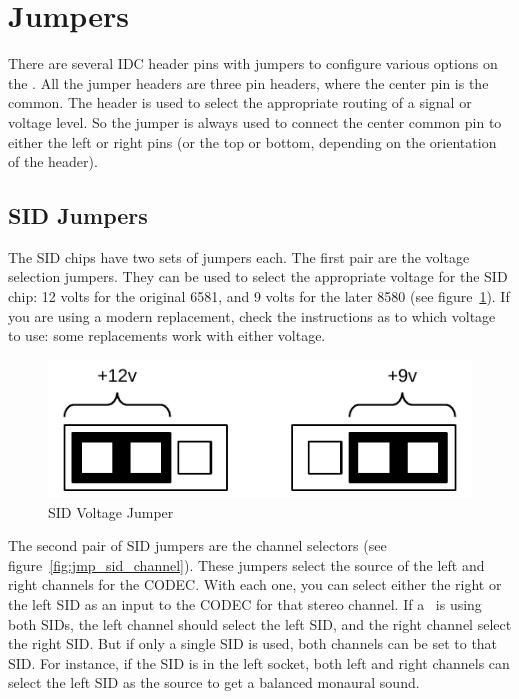 \section*{Jumpers}

There are several IDC header pins with jumpers to configure various options on the \fjr. All the jumper headers are three pin headers, where the center pin is the common. The header is used to select the appropriate routing of a signal or voltage level. So the jumper is always used to connect the center common pin to either the left or right pins (or the top or bottom, depending on the orientation of the header).

\subsection*{SID Jumpers}

The SID chips have two sets of jumpers each. The first pair are the voltage selection jumpers. They can be used to select the appropriate voltage for the SID chip: 12 volts for the original 6581, and 9 volts for the later 8580 (see figure~\ref{fig:jmp_sid_voltage}). If you are using a modern replacement, check the instructions as to which voltage to use: some replacements work with either voltage.

\begin{figure}[ht]
    \begin{center}
        \includegraphics[scale=0.65]{images/jumper_voltage.pdf}
    \end{center}
    \caption{SID Voltage Jumper}
    \label{fig:jmp_sid_voltage}
\end{figure}

The second pair of SID jumpers are the channel selectors (see figure~\ref{fig:jmp_sid_channel}). These jumpers select the source of the left and right channels for the CODEC. With each one, you can select either the right or the left SID as an input to the CODEC for that stereo channel. If a \fjr\ is using both SIDs, the left channel should select the left SID, and the right channel select the right SID. But if only a single SID is used, both channels can be set to that SID. For instance, if the SID is in the left socket, both left and right channels can select the left SID as the source to get a balanced monaural sound.

